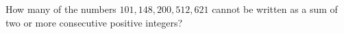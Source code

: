 How many of the numbers $101,148,200,512,621$ cannot be written as a sum of two or more consecutive positive integers?

